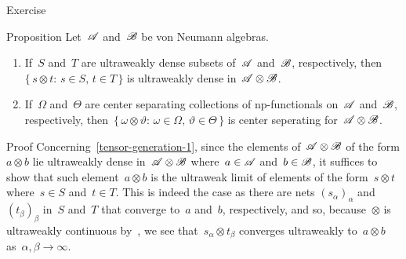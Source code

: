 \documentclass[a]{subfiles}
\begin{document}
\begin{parsec}
\begin{point}{Exercise}
\begin{enumerate}
\end{enumerate}
\end{point}
\begin{point}{Proposition}
Let~$\mathscr{A}$ and~$\mathscr{B}$ 
be von Neumann algebras.
\begin{enumerate}
\item
\label{tensor-generation-1}
If~$S$ and~$T$ are ultraweakly dense subsets of~$\mathscr{A}$
and~$\mathscr{B}$, respectively,
then~$\{\,s\otimes t\colon\,s\in S,\,t\in T\,\}$
is ultraweakly dense in~$\mathscr{A}\otimes\mathscr{B}$.
\item
\label{tensor-generation-2}
If~$\Omega$ and~$\Theta$ are center separating collections
of np-functionals on~$\mathscr{A}$ and~$\mathscr{B}$, respectively,
then~$\{\,\omega\otimes\vartheta\colon\, 
\omega\in\Omega,\,\vartheta\in\Theta\,\}$
is center seperating for~$\mathscr{A}\otimes\mathscr{B}$.
\end{enumerate}
\begin{point}{Proof}%
Concerning~\ref{tensor-generation-1},
since the elements of~$\mathscr{A}\otimes\mathscr{B}$
of the form $a\otimes b$
lie ultraweakly dense in~$\mathscr{A}\otimes\mathscr{B}$ 
where~$a\in\mathscr{A}$ and~$b\in\mathscr{B}$,
it suffices to show that such element~$a\otimes b$
is the ultraweak limit of elements of the form~$s\otimes t$
where~$s\in S$ and~$t\in T$.
This is indeed the case
as there are nets $(s_\alpha)_\alpha$
and~$(t_\beta)_\beta$ in~$S$ and~$T$
that converge to~$a$ and~$b$, respectively,
and so, 
because~$\otimes$ is ultraweakly continuous by~,
we see that~$s_\alpha\otimes t_\beta$
converges ultraweakly to~$a\otimes b$
as~$\alpha,\beta\to\infty$.


\end{point}
\end{point}
\end{parsec}
\end{document}
